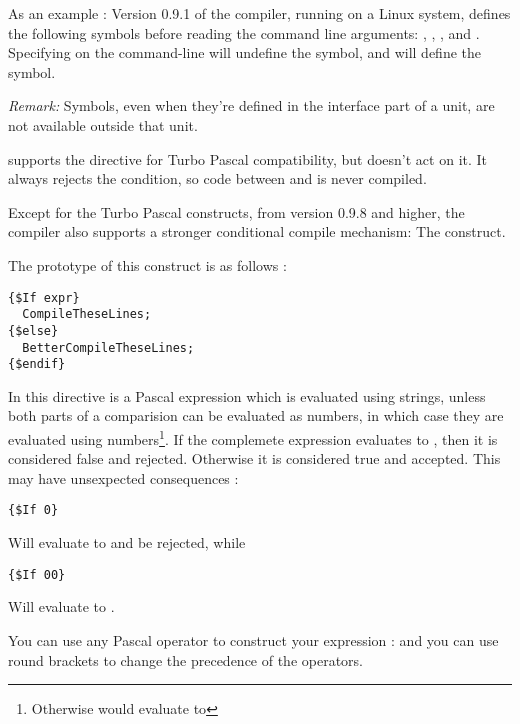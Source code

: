 \documentclass{report}
\begin{document}
As an example : Version 0.9.1 of the compiler, running on a Linux system,
defines the following symbols before reading the command line arguments:
, , ,  and .
Specifying  on the command-line will undefine the 
symbol, and will define the  symbol. 

{\em Remark: } Symbols, even when they're defined in the interface part of 
a unit, are not available outside that unit.

\fpc supports the  directive for Turbo Pascal
compatibility, but doesn't act on it. It always rejects the condition, so
code between  and  is never compiled.

Except for the Turbo Pascal constructs, from version 0.9.8 and higher,
the \fpc compiler also supports a stronger conditional compile mechanism: 
The  construct. 

The prototype of this construct is as follows :
\begin{verbatim}
{$If expr}
  CompileTheseLines;
{$else}
  BetterCompileTheseLines;
{$endif}
\end{verbatim}
In this directive  is a Pascal expression which is evaluated using
strings, unless both parts of a comparision can be evaluated as numbers, 
in which case they are evaluated using numbers\footnote{Otherwise
 would evaluate to }.
If the complemete expression evaluates to , then it is considered 
false and rejected. Otherwise it is considered true and accepted. This may
have unsexpected consequences :
\begin{verbatim}
{$If 0}
\end{verbatim}
Will evaluate to  and be rejected, while
\begin{verbatim}
{$If 00}
\end{verbatim}
Will evaluate to .

You can use any Pascal operator to construct your expression :  and you can use round brackets to change the
precedence of the operators.
\end{document}
